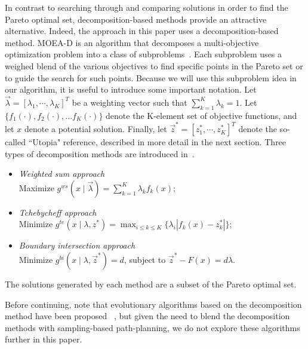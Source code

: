\documentclass[conference]{IEEEtran}
\begin{document}
In contrast to searching through and comparing solutions in order to find the Pareto optimal set, decomposition-based methods provide an attractive alternative.  Indeed, the approach in this paper uses a decomposition-based method.  
MOEA-D is an algorithm that decomposes a multi-objective optimization problem into a class of subproblems~\cite{4358754}.  Each subproblem uses a weighed blend of the various objectives to find specific points in the Pareto set or to guide the search for such points.  Because we  will use this subproblem idea in our algorithm, it is useful to introduce some important notation.
Let $ \vec{\lambda} = [ \lambda_{1} , \cdots , \lambda_{K}  ]^{T} $ be a weighting vector such that $ \sum_{k=1}^{K} \lambda_{k} = 1 $.  Let $\{f_1(\cdot), f_2(\cdot), ... f_{K}(\cdot)\}$ denote the K-element set of objective functions, and let $x$ denote a potential solution.  Finally, let $ \vec{z}^{*} = [z^{*}_{1}, \cdots , z^{*}_{K}]^{T} $ denote the so-called ``Utopia" reference, described in more detail in the next section. 
Three types of decomposition methods are introduced in~\cite{4358754}.
\begin{itemize}
\item \emph{Weighted sum approach} \\
Maximize $ g^{ws} (x \mid \vec{\lambda}) = \sum_{k=1}^{K} \lambda_{k} f_{k} (x) $;
\item \emph{Tchebycheff approach} \\
Minimize $ g^{te} (x \mid \lambda , z^{*}) = \max_{i \leq k \leq K}  \{ \lambda_{i} | f_{k}(x) - z^{*}_{k}  | \} $;
\item \emph{Boundary intersection approach} \\
Minimize $ g^{bi} (x \mid \lambda , \vec{z}^{*} ) = d $, subject to $ \vec{z}^{*} - F(x) = d \lambda $.
\end{itemize}
The solutions generated by each method are a subset of the Pareto optimal set.

Before continuing, note that evolutionary algorithms based on the decomposition method have been proposed ~\cite{6600851}, but given the need to blend the decomposition methods with sampling-based path-planning, we do not explore these algorithms further in this paper.
\end{document}
